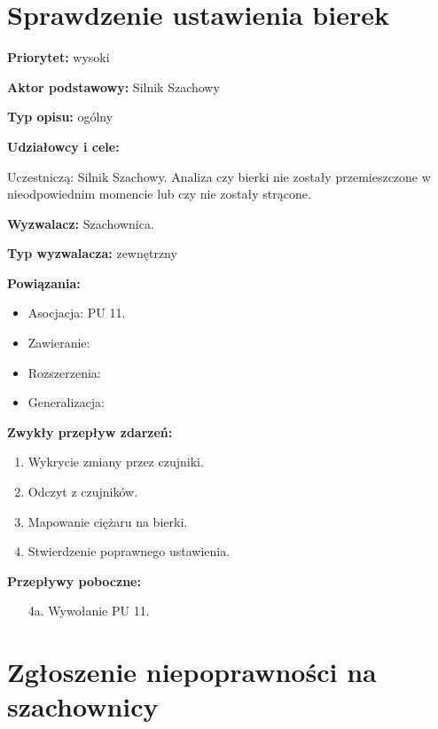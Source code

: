 \documentclass[12pt]{article}
\begin{document}




\section{Sprawdzenie ustawienia bierek}

\textbf{Priorytet:} wysoki

\textbf{Aktor podstawowy:} Silnik Szachowy

\textbf{Typ opisu:} ogólny

\textbf{Udziałowcy i cele:} 

Uczestniczą: Silnik Szachowy. Analiza czy bierki nie zostały przemieszczone w nieodpowiednim momencie lub czy nie zostały strącone.

\textbf{Wyzwalacz:} Szachownica.

\textbf{Typ wyzwalacza:} zewnętrzny

\textbf{Powiązania:} 
	\begin{itemize}\item Asocjacja: PU 11.
	\item Zawieranie: 
	\item Rozszerzenia:
	\item Generalizacja:
\end{itemize} 

\textbf{Zwykły przepływ zdarzeń:}  
\begin{enumerate}
\item Wykrycie zmiany przez czujniki.
\item Odczyt z czujników.
\item Mapowanie ciężaru na bierki.
\item Stwierdzenie poprawnego ustawienia.
\end{enumerate} 

\textbf{Przepływy poboczne:}
\begin{enumerate}
    \item[4a.] Wywołanie PU 11.
\end{enumerate}




\section{Zgłoszenie niepoprawności na szachownicy}
\end{document}
